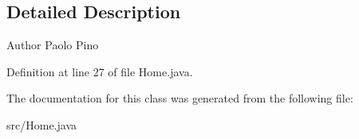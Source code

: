 \subsection{Detailed Description}
\begin{DoxyAuthor}{Author}
Paolo Pino 
\end{DoxyAuthor}


Definition at line 27 of file Home.\-java.



The documentation for this class was generated from the following file\-:\begin{DoxyCompactItemize}
\item 
src/Home.\-java\end{DoxyCompactItemize}
